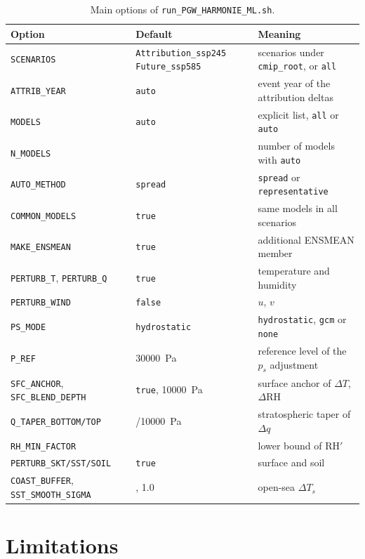 \documentclass[11pt,a4paper]{article}
\newcommand{\code}[1]{\texttt{#1}}
\newcommand{\dT}{\Delta T}
\newcommand{\dRH}{\Delta \mathrm{RH}}
\begin{document}
\begin{table}[htbp]
\centering
\caption{Main options of \code{run\_PGW\_HARMONIE\_ML.sh}.}
\label{tab:opts}
\small
\begin{tabularx}{\linewidth}{>{\raggedright\arraybackslash}p{4.6cm}>{\raggedright\arraybackslash}p{3.6cm}X}
\toprule
Option & Default & Meaning \\
\midrule
\code{SCENARIOS} & \code{Attribution\_ssp245} \code{Future\_ssp585} & scenarios under \code{cmip\_root}, or \code{all} \\
\code{ATTRIB\_YEAR} & \code{auto} & event year of the attribution deltas \\
\code{MODELS} & \code{auto} & explicit list, \code{all} or \code{auto} \\
\code{N\_MODELS} & 5 & number of models with \code{auto} \\
\code{AUTO\_METHOD} & \code{spread} & \code{spread} or \code{representative} \\
\code{COMMON\_MODELS} & \code{true} & same models in all scenarios \\
\code{MAKE\_ENSMEAN} & \code{true} & additional ENSMEAN member \\
\midrule
\code{PERTURB\_T}, \code{PERTURB\_Q} & \code{true} & temperature and humidity \\
\code{PERTURB\_WIND} & \code{false} & $u$, $v$ \\
\code{PS\_MODE} & \code{hydrostatic} & \code{hydrostatic}, \code{gcm} or \code{none} \\
\code{P\_REF} & \SI{30000}{Pa} & reference level of the $p_s$ adjustment \\
\code{SFC\_ANCHOR}, \code{SFC\_BLEND\_DEPTH} & \code{true}, \SI{10000}{Pa} & surface anchor of $\dT$, $\dRH$ \\
\code{Q\_TAPER\_BOTTOM/TOP} & 15000/\SI{10000}{Pa} & stratospheric taper of $\Delta q$ \\
\code{RH\_MIN\_FACTOR} & 0.5 & lower bound of $\mathrm{RH}'$ \\
\code{PERTURB\_SKT/SST/SOIL} & \code{true} & surface and soil \\
\code{COAST\_BUFFER}, \code{SST\_SMOOTH\_SIGMA} & 2, 1.0 & open-sea $\Delta T_s$ \\
\bottomrule
\end{tabularx}
\end{table}

\section{Limitations}
\label{sec:limits}
\end{document}
